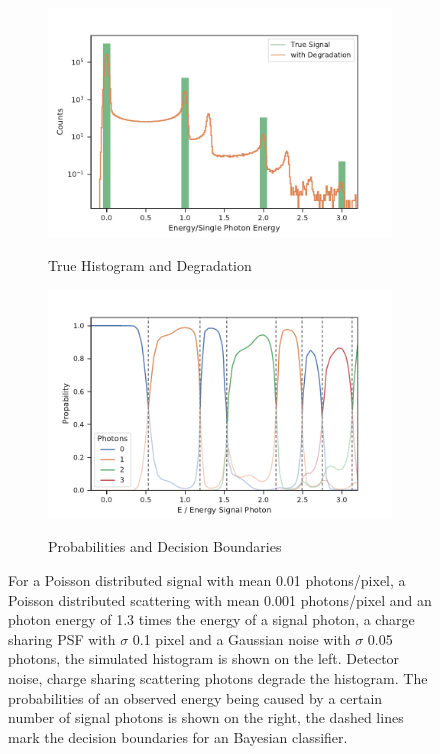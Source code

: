 \begin{figure}
	\centering
	\begin{subfigure}[b]{0.45\textwidth}
		\includegraphics[width=\linewidth]{images/sharing.pdf}
		\label{fig:degrad}
		\caption{True Histogram and Degradation}
	\end{subfigure}
	\begin{subfigure}[b]{0.45\textwidth}
		\includegraphics[width=\linewidth]{images/probs.pdf}
		\label{fig:probs}
		\caption{Probabilities and Decision Boundaries}
	\end{subfigure}
	
	\caption[Histogram, probabilities and decision boundaries for the photon number]{For a Poisson distributed signal with mean 0.01 photons/pixel, a Poisson distributed scattering with mean 0.001 photons/pixel and an photon energy of 1.3 times the energy of a signal photon, a charge sharing PSF with $\sigma$ 0.1 pixel and a Gaussian noise with $\sigma$ 0.05 photons, the simulated histogram is shown on the left. Detector noise, charge sharing scattering photons degrade the histogram. The probabilities of an observed energy being caused by a certain number of signal photons is shown on the right, the dashed lines mark the decision boundaries for an Bayesian classifier.} 
\end{figure}


